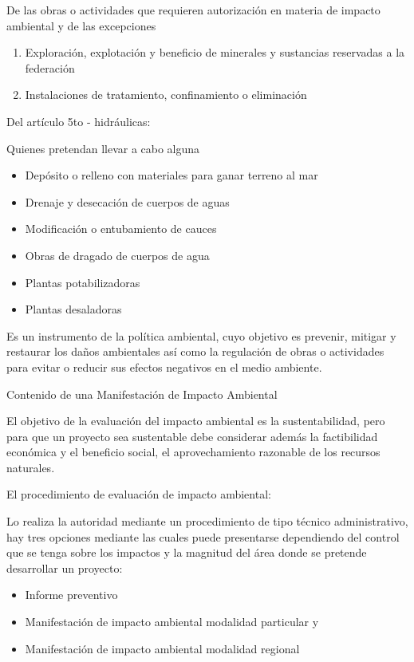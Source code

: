 De las obras o actividades que requieren autorización en materia de impacto ambiental y de las excepciones
\begin{enumerate}
    \item Exploración, explotación y beneficio de minerales y sustancias reservadas a la federación
    \item Instalaciones de tratamiento, confinamiento o eliminación
\end{enumerate}
Del artículo 5to - hidráulicas:

Quienes pretendan llevar a cabo alguna
\begin{itemize}
    \item Depósito o relleno con materiales para ganar terreno al mar
    \item Drenaje y desecación de cuerpos de aguas
    \item Modificación o entubamiento de cauces
    \item Obras de dragado de cuerpos de agua
    \item Plantas potabilizadoras
    \item Plantas desaladoras
\end{itemize}


\begin{definition}
    Es un instrumento de la política ambiental, cuyo objetivo es prevenir, mitigar y restaurar los daños ambientales así como la regulación de obras o actividades para evitar o reducir sus efectos negativos en el medio ambiente.
\end{definition}
Contenido de una Manifestación de Impacto Ambiental

El objetivo de la evaluación del impacto ambiental es la sustentabilidad, pero para que un proyecto sea sustentable debe considerar además la factibilidad económica y el beneficio social, el aprovechamiento razonable de los recursos naturales.

El procedimiento de evaluación de impacto ambiental: 

Lo realiza la autoridad mediante un procedimiento de tipo técnico administrativo, hay tres opciones mediante las cuales puede presentarse dependiendo del control que se tenga sobre los impactos y la magnitud del área donde se pretende desarrollar un proyecto:
\begin{itemize}
    \item Informe preventivo
    \item Manifestación de impacto ambiental modalidad particular y 
    \item Manifestación de impacto ambiental modalidad regional
\end{itemize}


